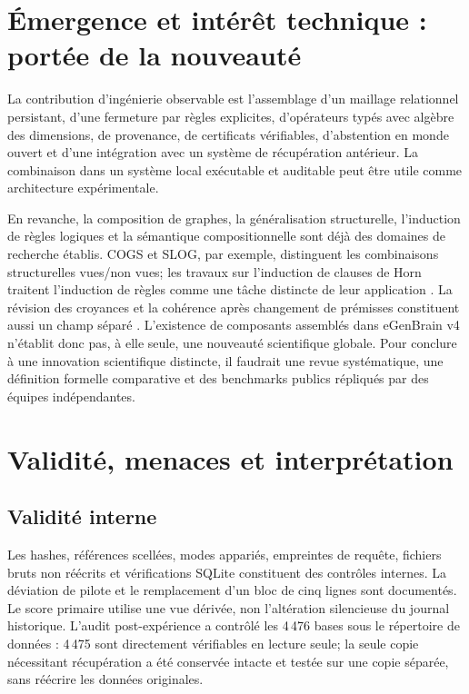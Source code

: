 \documentclass[11pt,a4paper]{article}
\begin{document}
\section{Émergence et intérêt technique : portée de la nouveauté}
La contribution d’ingénierie observable est l’assemblage d’un maillage relationnel persistant, d’une fermeture par règles explicites, d’opérateurs typés avec algèbre des dimensions, de provenance, de certificats vérifiables, d’abstention en monde ouvert et d’une intégration avec un système de récupération antérieur. La combinaison dans un système local exécutable et auditable peut être utile comme architecture expérimentale.

En revanche, la composition de graphes, la généralisation structurelle, l’induction de règles logiques et la sémantique compositionnelle sont déjà des domaines de recherche établis. COGS et SLOG, par exemple, distinguent les combinaisons structurelles vues/non vues; les travaux sur l’induction de clauses de Horn traitent l’induction de règles comme une tâche distincte de leur application \cite{kimlinzen2020cogs,lislog2023,buntine1987}. La révision des croyances et la cohérence après changement de prémisses constituent aussi un champ séparé \cite{delgrande2003}. L’existence de composants assemblés dans eGenBrain v4 n’établit donc pas, à elle seule, une nouveauté scientifique globale. Pour conclure à une innovation scientifique distincte, il faudrait une revue systématique, une définition formelle comparative et des benchmarks publics répliqués par des équipes indépendantes.

\section{Validité, menaces et interprétation}
\subsection{Validité interne}
Les hashes, références scellées, modes appariés, empreintes de requête, fichiers bruts non réécrits et vérifications SQLite constituent des contrôles internes. La déviation de pilote et le remplacement d’un bloc de cinq lignes sont documentés. Le score primaire utilise une vue dérivée, non l’altération silencieuse du journal historique. L’audit post-expérience a contrôlé les 4\,476 bases sous le répertoire de données : 4\,475 sont directement vérifiables en lecture seule; la seule copie nécessitant récupération a été conservée intacte et testée sur une copie séparée, sans réécrire les données originales.
\end{document}
